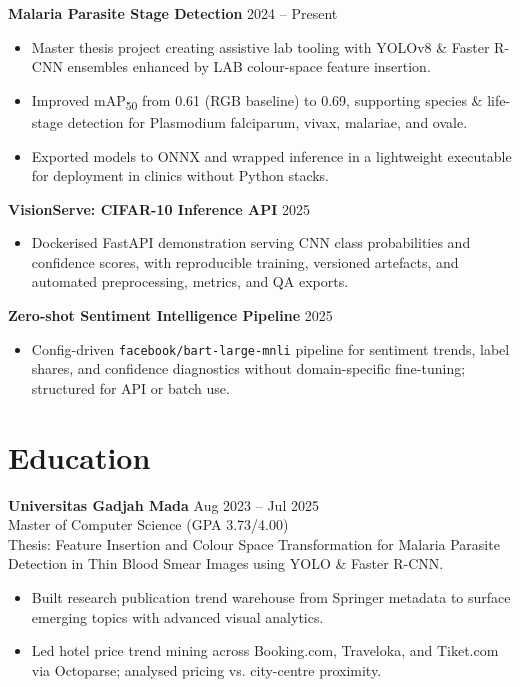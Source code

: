\documentclass[10pt,a4paper]{article}
\begin{document}
\textbf{Malaria Parasite Stage Detection} \hfill 2024 -- Present
\begin{itemize}
  \item Master thesis project creating assistive lab tooling with YOLOv8 \& Faster R-CNN ensembles enhanced by LAB colour-space feature insertion.
  \item Improved mAP\textsubscript{50} from 0.61 (RGB baseline) to 0.69, supporting species \& life-stage detection for Plasmodium falciparum, vivax, malariae, and ovale.
  \item Exported models to ONNX and wrapped inference in a lightweight executable for deployment in clinics without Python stacks.
\end{itemize}

\textbf{VisionServe: CIFAR-10 Inference API} \hfill 2025
\begin{itemize}
  \item Dockerised FastAPI demonstration serving CNN class probabilities and confidence scores, with reproducible training, versioned artefacts, and automated preprocessing, metrics, and QA exports.
\end{itemize}

\textbf{Zero-shot Sentiment Intelligence Pipeline} \hfill 2025
\begin{itemize}
  \item Config-driven \texttt{facebook/bart-large-mnli} pipeline for sentiment trends, label shares, and confidence diagnostics without domain-specific fine-tuning; structured for API or batch use.
\end{itemize}

\section*{Education}
\textbf{Universitas Gadjah Mada} \hfill Aug 2023 -- Jul 2025\\
Master of Computer Science (GPA 3.73/4.00) \\
Thesis: Feature Insertion and Colour Space Transformation for Malaria Parasite Detection in Thin Blood Smear Images using YOLO \& Faster R-CNN.
\begin{itemize}
  \item Built research publication trend warehouse from Springer metadata to surface emerging topics with advanced visual analytics.
  \item Led hotel price trend mining across Booking.com, Traveloka, and Tiket.com via Octoparse; analysed pricing vs. city-centre proximity.
\end{itemize}
\end{document}
